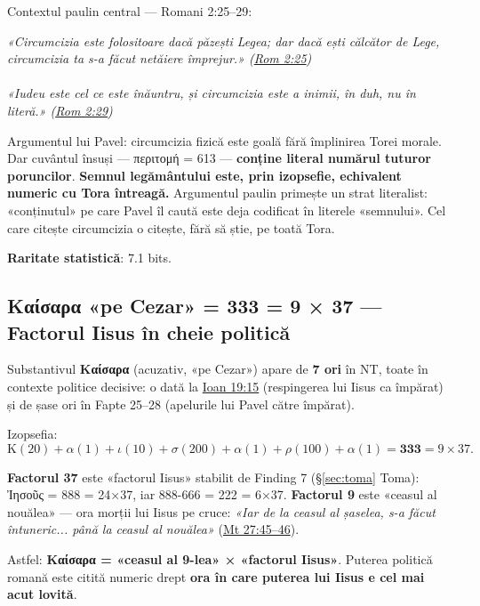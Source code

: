 \documentclass[12pt,a4paper,twoside,openany]{book}
\begin{document}
Contextul paulin central — Romani 2:25--29:

\begin{biblequote}
\textit{«Circumcizia este folositoare dacă păzești Legea; dar dacă ești călcător de Lege, circumcizia ta s-a făcut netăiere împrejur.» (\href{https://bibliaortodoxa.ro/carte.php?id=70\&cap=2\#25}{Rom 2:25})} \\
[...] \\
\textit{«Iudeu este cel ce este înăuntru, și circumcizia este a inimii, în duh, nu în literă.» (\href{https://bibliaortodoxa.ro/carte.php?id=70\&cap=2\#29}{Rom 2:29})}
\end{biblequote}

Argumentul lui Pavel: circumcizia fizică este goală fără împlinirea Torei morale. Dar cuvântul însuși — περιτομή = 613 — \textbf{conține literal numărul tuturor poruncilor}. \textbf{Semnul legământului este, prin izopsefie, echivalent numeric cu Tora întreagă.} Argumentul paulin primește un strat literalist: «conținutul» pe care Pavel îl caută este deja codificat în literele «semnului». Cel care citește circumcizia o citește, fără să știe, pe toată Tora.

\textbf{Raritate statistică}: 7.1 bits.

\subsection{\texorpdfstring{Καίσαρα}{Kaisara} «pe Cezar» = 333 = 9 × 37 — Factorul Iisus în cheie politică}
\label{sec:kaisara}

Substantivul \textbf{Καίσαρα} (acuzativ, «pe Cezar») apare de \textbf{7 ori} în NT, toate în contexte politice decisive: o dată la \href{https://bibliaortodoxa.ro/carte.php?id=35\&cap=19\#15}{Ioan 19:15} (respingerea lui Iisus ca împărat) și de șase ori în Fapte 25--28 (apelurile lui Pavel către împărat).

Izopsefia:
\[
\mathrm{K}(20) + \alpha(1) + \iota(10) + \sigma(200) + \alpha(1) + \rho(100) + \alpha(1) = \mathbf{333} = 9 \times 37.
\]

\textbf{Factorul 37} este «factorul Iisus» stabilit de Finding 7 (\S\ref{sec:toma} Toma): Ἰησοῦς = 888 = 24×37, iar 888-666 = 222 = 6×37. \textbf{Factorul 9} este «ceasul al nouălea» — ora morții lui Iisus pe cruce: \textit{«Iar de la ceasul al șaselea, s-a făcut întuneric... până la ceasul al nouălea»} (\href{https://bibliaortodoxa.ro/carte.php?id=55\&cap=27\#45}{Mt 27:45--46}).

Astfel: \textbf{Καίσαρα = «ceasul al 9-lea» × «factorul Iisus»}. Puterea politică romană este citită numeric drept \textbf{ora în care puterea lui Iisus e cel mai acut lovită}.
\end{document}
